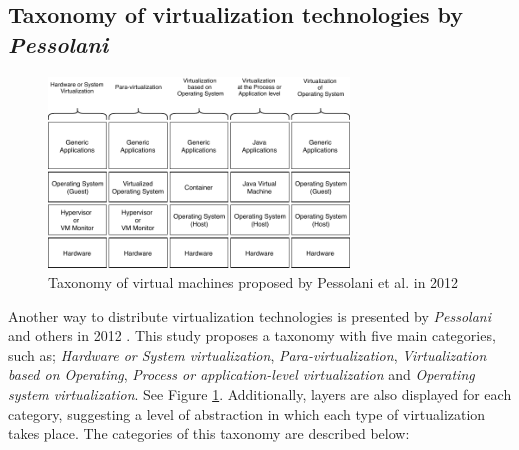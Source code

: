 	\subsection{Taxonomy of virtualization technologies by \textit{Pessolani}}
	
	\begin{figure}[!hbtp]
		\centering
		\includegraphics[width=8cm]{images/Pessolani2012.pdf}
		\vspace{-0.2cm}
		\caption{Taxonomy of virtual machines proposed by Pessolani et al. in 2012\footnotemark[8]{}}
		\label{fig:TaxonomiaDeTecnologiasDeVirtualizacion}
	\end{figure}
	
	
	Another way to distribute virtualization technologies is presented by \textit{Pessolani} and others in 2012 \cite{Pessolani2012}.  This study proposes a taxonomy with five main categories, such as; \textit{Hardware or System virtualization}, \textit{Para-virtualization}, \textit{Virtualization based on Operating}, \textit{Process or application-level virtualization} and \textit{Operating system virtualization}. See Figure \ref{fig:TaxonomiaDeTecnologiasDeVirtualizacion}. Additionally, layers are also displayed for each category, suggesting a level of abstraction in which each type of virtualization takes place. The categories of this taxonomy are described below:
	
		
		
